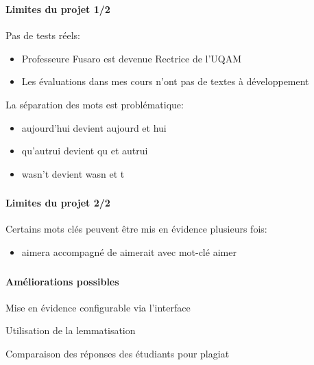 \documentclass{beamer}
\begin{document}
  \begin{frame}
  \frametitle{\insertsection}
  \framesubtitle{Limites du projet 1/2}
  Pas de tests réels:
  \begin{itemize}
    \item Professeure Fusaro est devenue Rectrice de l'UQAM
    \item Les \'evaluations dans mes cours n'ont pas de textes \`a d\'eveloppement
  \end{itemize}
  
  \bigskip
  
  La s\'eparation des mots est probl\'ematique:
  \begin{itemize}
    \item \og aujourd'hui \fg{} devient \og aujourd \fg{} et \og hui \fg{} 
    \item \og qu'autrui \fg{} devient \og qu \fg{} et \og autrui \fg{} 
    \item \og wasn't \fg{} devient \og wasn \fg{} et \og t \fg{} 
  \end{itemize}
  \end{frame}
  
  \begin{frame}
  \frametitle{\insertsection}
  \framesubtitle{Limites du projet 2/2}
  Certains mots cl\'es peuvent \^etre mis en \'evidence plusieurs fois:
  \begin{itemize}
    \item \og aimera \fg{} accompagn\'e de \og aimerait \fg{} avec mot-cl\'e \og aimer \fg{}
  \end{itemize}
  \end{frame}
  
  \begin{frame}
  \frametitle{\insertsection}
  \framesubtitle{Am\'eliorations possibles}
  Mise en \'evidence configurable via l'interface
  
  Utilisation de la lemmatisation
  
  Comparaison des r\'eponses des \'etudiants pour plagiat
  \end{frame}
\end{document}
